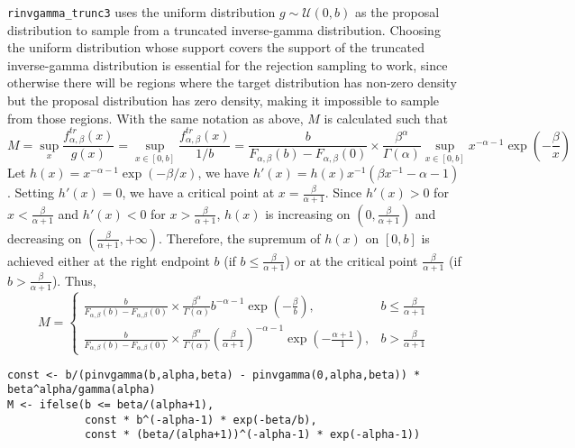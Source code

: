 \begin{answerenum}
    \item \texttt{rinvgamma\_trunc3} uses the uniform distribution \(g \sim \mathcal{U}(0, b)\) as the proposal distribution to sample from a truncated inverse-gamma distribution. Choosing the uniform distribution whose support covers the support of the truncated inverse-gamma distribution is essential for the rejection sampling to work, since otherwise there will be regions where the target distribution has non-zero density but the proposal distribution has zero density, making it impossible to sample from those regions.
    With the same notation as above, \(M\) is calculated such that
    \[ M = \sup_{x} \frac{f_{\alpha, \beta}^{tr}(x)}{g(x)} = \sup_{x \in [0,b]} \frac{f_{\alpha, \beta}^{tr}(x)}{1/b} = \frac{b}{F_{\alpha, \beta}(b) - F_{\alpha, \beta}(0)} \times \frac{\beta^{\alpha}}{\Gamma(\alpha)} \sup_{x \in [0, b]} x^{-\alpha-1} \exp \left(-\frac{\beta}{x}\right) \]
    Let \(h(x) = x^{-\alpha-1} \exp(-\beta/x)\), we have \(h'(x) = h(x) x^{-1} \left( \beta x^{-1} - \alpha - 1 \right) \). Setting \(h'(x) = 0\), we have a critical point at \(x = \frac{\beta}{\alpha + 1}\). Since \(h'(x) > 0\) for \(x < \frac{\beta}{\alpha + 1}\) and \(h'(x) < 0\) for \(x > \frac{\beta}{\alpha + 1}\), \(h(x)\) is increasing on \((0, \frac{\beta}{\alpha + 1})\) and decreasing on \((\frac{\beta}{\alpha + 1}, +\infty)\). Therefore, the supremum of \(h(x)\) on \([0, b]\) is achieved either at the right endpoint \(b\) (if \(b \leq \frac{\beta}{\alpha + 1}\)) or at the critical point \(\frac{\beta}{\alpha + 1}\) (if \(b > \frac{\beta}{\alpha + 1}\)). Thus,
    \[ M = \begin{cases}
        \frac{b}{F_{\alpha, \beta}(b) - F_{\alpha, \beta}(0)} \times \frac{\beta^{\alpha}}{\Gamma(\alpha)} b^{-\alpha-1} \exp \left(-\frac{\beta}{b}\right), & b \leq \frac{\beta}{\alpha + 1} \\[1em]
        \frac{b}{F_{\alpha, \beta}(b) - F_{\alpha, \beta}(0)} \times \frac{\beta^{\alpha}}{\Gamma(\alpha)} \left(\frac{\beta}{\alpha + 1}\right)^{-\alpha-1} \exp \left(-\frac{\alpha + 1}{1}\right), & b > \frac{\beta}{\alpha + 1}
    \end{cases} \]
    \begin{lstlisting}
const <- b/(pinvgamma(b,alpha,beta) - pinvgamma(0,alpha,beta)) * beta^alpha/gamma(alpha)
M <- ifelse(b <= beta/(alpha+1), 
            const * b^(-alpha-1) * exp(-beta/b),
            const * (beta/(alpha+1))^(-alpha-1) * exp(-alpha-1))
    \end{lstlisting}
\end{answerenum}